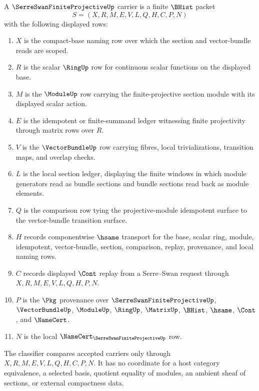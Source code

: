 \begin{definition}
\label{def:serre-swan-finite-projective-carrier}
A $\SerreSwanFiniteProjectiveUp$ carrier is a finite $\BHist$ packet
$$
S=(X,R,M,E,V,L,Q,H,C,P,N)
$$
with the following displayed rows:
\begin{enumerate}
\item $X$ is the compact-base naming row over which the section and vector-bundle reads are scoped.
\item $R$ is the scalar $\RingUp$ row for continuous scalar functions on the displayed base.
\item $M$ is the $\ModuleUp$ row carrying the finite-projective section module with its displayed scalar action.
\item $E$ is the idempotent or finite-summand ledger witnessing finite projectivity through matrix rows over $R$.
\item $V$ is the $\VectorBundleUp$ row carrying fibres, local trivializations, transition maps, and overlap checks.
\item $L$ is the local section ledger, displaying the finite windows in which module generators read as bundle sections and bundle sections read back as module elements.
\item $Q$ is the comparison row tying the projective-module idempotent surface to the vector-bundle transition surface.
\item $H$ records componentwise $\hsame$ transport for the base, scalar ring, module, idempotent, vector-bundle, section, comparison, replay, provenance, and local naming rows.
\item $C$ records displayed $\Cont$ replay from a Serre--Swan request through $X,R,M,E,V,L,Q,H,P,N$.
\item $P$ is the $\Pkg$ provenance over $\SerreSwanFiniteProjectiveUp$, $\VectorBundleUp$, $\ModuleUp$, $\RingUp$, $\MatrixUp$, $\BHist$, $\hsame$, $\Cont$, and $\NameCert$.
\item $N$ is the local $\NameCert_{\SerreSwanFiniteProjectiveUp}$ row.
\end{enumerate}
The classifier compares accepted carriers only through $X,R,M,E,V,L,Q,H,C,P,N$. It has no coordinate for a host category equivalence, a selected basis, quotient equality of modules, an ambient sheaf of sections, or external compactness data.
\end{definition}

